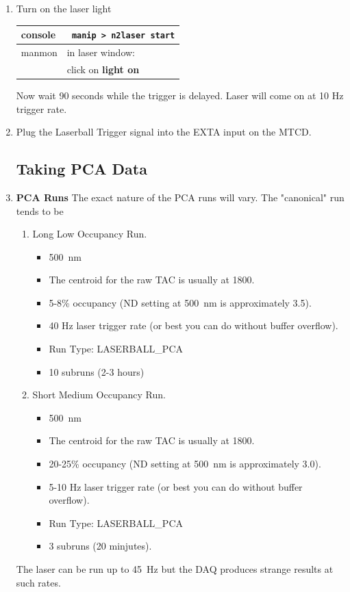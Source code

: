\documentclass[11pt]{article}
\begin{document}
\begin{enumerate}
\item  \CheckBox[name=rlup52]{} Turn on the laser light
\begin{center}
\begin{tabular}{|l|l|}
\hline
console & \verb+ manip > n2laser start+ \\
\hline
manmon & in laser window: \\
& click on {\bf light on} \\
\hline
\end{tabular}
\end{center}
Now wait 90 seconds while the trigger is delayed. Laser will come on at 10 Hz trigger rate.
\item  \CheckBox[name=rlup52]{} Plug the Laserball Trigger signal into the EXTA input on the MTCD.

\subsection{Taking PCA Data}
\item {\bf PCA Runs} The exact nature of the PCA runs will vary. The "canonical" run tends to be 
	\begin{enumerate}
	\item \CheckBox[name=PCA1]{} Long Low Occupancy Run.
		\begin{itemize}
		\item 500~nm
		\item The centroid for the raw TAC is usually at 1800.
		\item 5-8\% occupancy (ND setting at 500~nm is approximately 3.5).
		\item 40 Hz laser trigger rate (or best you can do without buffer overflow).
		\item Run Type: LASERBALL\_PCA
		\item 10 subruns (2-3 hours)
		\end{itemize}
	\item \CheckBox[name=PCA2]{} Short Medium Occupancy Run.
		\begin{itemize}
		\item 500~nm
		\item The centroid for the raw TAC is usually at 1800.
		\item 20-25\% occupancy (ND setting at 500~nm is approximately 3.0).
		\item 5-10 Hz laser trigger rate (or best you can do without buffer overflow).
		\item Run Type: LASERBALL\_PCA
		\item 3 subruns (20 minjutes).
		\end{itemize}
	\end{enumerate}
	The laser can be run up to 45~Hz but the DAQ produces strange results at such rates.

\end{enumerate}
\end{document}
